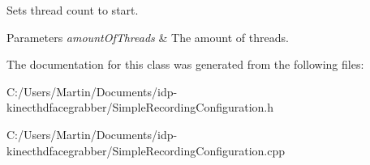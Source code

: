 Sets thread count to start. 


\begin{DoxyParams}{Parameters}
{\em amount\+Of\+Threads} & The amount of threads. \\
\hline
\end{DoxyParams}


The documentation for this class was generated from the following files\+:\begin{DoxyCompactItemize}
\item 
C\+:/\+Users/\+Martin/\+Documents/idp-\/kinecthdfacegrabber/Simple\+Recording\+Configuration.\+h\item 
C\+:/\+Users/\+Martin/\+Documents/idp-\/kinecthdfacegrabber/Simple\+Recording\+Configuration.\+cpp\end{DoxyCompactItemize}

